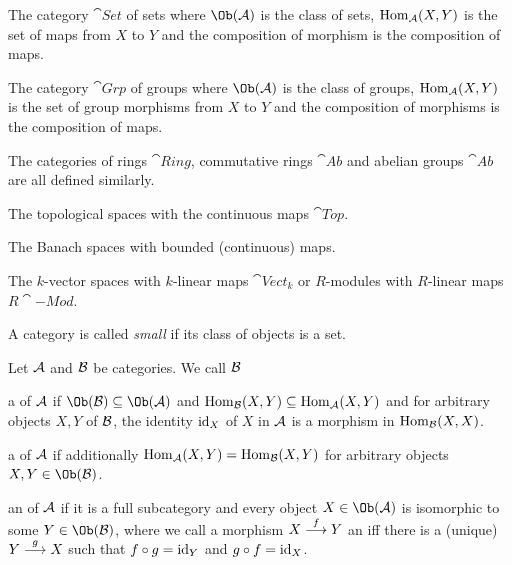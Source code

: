 \documentclass[a4paper,parskip=half,numbers=enddot, DIV=12]{scrreprt}
\begin{document}
\begin{example}
    \begin{alphanumerate}
        \item 
            The category $\cat{Set}$ of sets where $\Ob(\Aa)$ is the class of sets, $\operatorname{Hom}_{\mathcal{A}}(X,Y)$ is the set of maps from $X$ to $Y$ and the composition of morphism is the composition of maps.
        \item 
            The category $\cat{Grp}$ of groups where $\Ob(\Aa)$ is the class of groups, $\operatorname{Hom}_{\mathcal{A}}(X,Y)$ is the set of group morphisms from $X$ to $Y$ and the composition of morphisms is the composition of maps.
        \item 
            The categories of rings $\cat{Ring}$, commutative rings $\cat{Ab}$ and abelian groups $\cat{Ab}$ are all defined similarly.
        \item 
            The topological spaces with the continuous maps $\cat{Top}$.
        \item 
            The Banach spaces with bounded (continuous) maps.
        \item 
            The $k$-vector spaces with $k$-linear maps $\cat{Vect}_k$ or $R$-modules with $R$-linear maps $R\cat{-Mod}$.
    \end{alphanumerate}
\end{example}
A category is called \emph{small} if its class of objects is a set.

\begin{defi}
	Let $\mathcal{A}$ and $\mathcal{B}$ be categories. We call $\mathcal{B}$
	\begin{alphanumerate}
		\item a  of $\mathcal{A}$ if $\Ob(\Bb) \subseteq \Ob(\Aa)$ and $\operatorname{Hom}_{\mathcal{B}}(X,Y) \subseteq \operatorname{Hom}_{\mathcal{A}}(X,Y)$ and for arbitrary objects $X,Y$ of $\mathcal{B}$, the identity $\operatorname{id}_X$ of $X$ in $\mathcal{A}$ is a morphism in $\operatorname{Hom}_{\mathcal{B}}(X,X)$.
		\item a  of $\mathcal{A}$ if additionally $\operatorname{Hom}_{\mathcal{A}}(X,Y) = \operatorname{Hom}_{\mathcal{B}}(X,Y)$ for arbitrary objects $X,Y\in\Ob(\Bb)$.
		\item an  of $\mathcal{A}$ if it is a full subcategory and every object $X\in \Ob(\Aa)$ is isomorphic to some $Y\in\Ob(\Bb)$, where we call a morphism $X\morphism[f] Y$ an  iff there  is a (unique) $Y\morphism[g] X$ such that $f\circ g = \operatorname{id}_Y$ and $g\circ f= \operatorname{id}_X$.
	\end{alphanumerate}
\end{defi}
\end{document}
